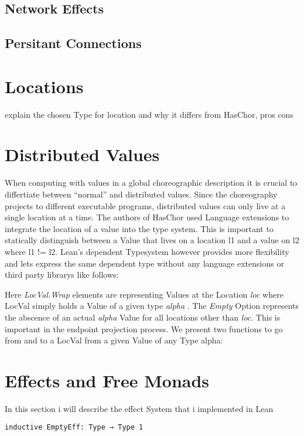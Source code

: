 \subsection{Network Effects}


\subsection{Persitant Connections}



\section{Locations}

explain the chosen Type for location and why it differs from HasChor, pros cons

\section{Distributed Values}
When computing with values in a global choreographic description it is crucial to differtiate between ``normal'' and distributed values. Since the choreography projects to different executable programs, distributed values can only live at a single location at a time. The authors of HasChor used Language extensions to integrate the location of a value into the type system. This is important to statically distinguish between a Value that lives on a location l1 and a value on l2 where l1 != l2.
Lean's dependent Typesystem however provides more flexibility and lets express the same dependent type without any language extensions or third party librarys like follows:


Here \emph{LocVal.Wrap} elements are representing Values at the Location \emph{loc} where LocVal simply holds a Value of a given type \emph{ alpha }.
The \emph{Empty} Option represents the abscence of an actual \emph{alpha} Value for all locations other than \emph{loc}. This is important in the endpoint projection process. We present two functions to go from and to a LocVal from a given Value of any Type alpha:



\section{Effects and Free Monads}
In this section i will describe the effect System that i implemented in Lean

\begin{lstlisting}[language=lean]
inductive EmptyEff: Type → Type 1
\end{lstlisting}

\begin{lstlisting}[language=lean]
\end{lstlisting}

